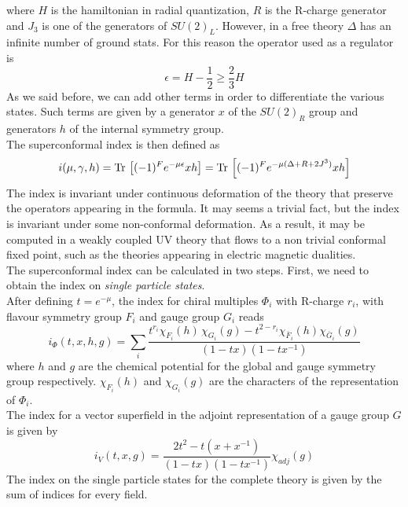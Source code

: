  where $H$ is the hamiltonian in radial quantization, $R$ is the R-charge generator and $J_3$ is one of the generators of $SU(2)_L$. 
 However, in a free theory $\Delta$ has an infinite number of ground stats. 
 For this reason the operator used as a regulator is \cite{Romelsberger:2005eg}
 \begin{equation}
 	\epsilon = H - \frac{1}{2} \geq \frac{2}{3} H 
 \end{equation}
As we said before, we can add other terms in order to differentiate the various states.
Such terms are given by a generator $x $ of the $SU(2)_R$ group and generators $h$ of the internal symmetry group.\\
The superconformal index is then defined as 
\begin{equation}
 i( \mu, \gamma,h) =
  \mathrm{Tr } \,  \left[  (-1)^F e^{ - \mu \epsilon } x h   \right] = 
 \mathrm{Tr } \, \left[  (-1)^F
  e^{- \mu (\Delta + R + 2 J^3)}  x h   \right]
 \end{equation} 
The index is invariant under continuous deformation of the theory that preserve the operators appearing in the formula.
It may seems a trivial fact, but the index is invariant under some non-conformal deformation.
As a result, it may be computed in a weakly coupled UV theory that flows to a non trivial conformal fixed point, such as the theories appearing in electric magnetic dualities. \\
The superconformal index can be calculated in two steps.
First, we need to obtain the index on \emph{single particle states}.\\
After defining $t = e^{-\mu}$, the index for chiral multiples $\Phi_i$ with R-charge $r_i$, with flavour symmetry group $F_i$ and gauge group $G_i$ reads
\begin{equation}
i_{\Phi}(t,x,h,g) = \sum_{i} \frac{ t^{r_i} \chi_{F_i}(h) \, \chi_{G_i}(g) - t^{2-r_i} \chi_{\bar{F}_i}(h) \chi_{\bar{G}_i}(g)}{ (1-tx) (1- t x^{-1})}
\end{equation}
where $h$ and $g$ are the chemical potential for the global and gauge symmetry group respectively. $\chi_{F_i}(h)$ and $\chi_{G_i}(g)$ are the characters of the representation of $\Phi_i$.\\
The index for a vector superfield in the adjoint representation of a gauge group $G$ is given by \cite{Dolan:2008qi}
\begin{equation}
i_{V} (t,x,g) = \frac{2 t^2 - t(x + x^{-1})}{(1-tx) (1 - tx^{-1})} \chi_{adj}(g)
\end{equation}
The index on the single particle states for the complete theory is given by the sum of indices for every field. 
